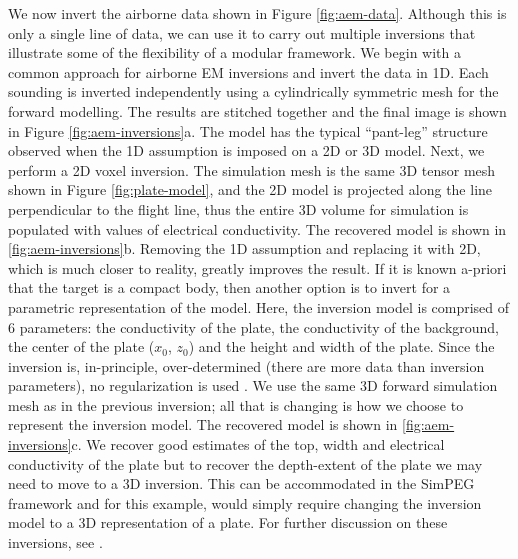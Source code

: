 \documentclass[paper]{geophysics}
\begin{document}
We now invert the airborne data shown in Figure \ref{fig:aem-data}. Although this is only a single line of data, we can use it to carry out multiple inversions that illustrate some of the flexibility of a modular framework. We begin with a  common approach for airborne EM inversions and invert the data in 1D. Each sounding is inverted independently using a cylindrically symmetric mesh for the forward modelling. The results are stitched together and the final image is shown in Figure \ref{fig:aem-inversions}a. The model has the typical ``pant-leg'' structure observed when the 1D assumption is imposed on a 2D or 3D model. Next, we perform a 2D voxel inversion. The simulation mesh is the same 3D tensor mesh shown in Figure \ref{fig:plate-model}, and the 2D model is projected along the line perpendicular to the flight line, thus the entire 3D volume for simulation is populated with values of electrical conductivity.  The recovered model is shown in \ref{fig:aem-inversions}b. Removing the 1D assumption and replacing it with  2D, which is much closer to reality, greatly improves the result. If it is known a-priori that the target is a compact body, then another option is to invert for a parametric representation of the model. Here, the inversion model is comprised of 6 parameters: the conductivity of the plate, the conductivity of the background, the center of the plate ($x_0$, $z_0$) and the height and width of the plate. Since the inversion is, in-principle, over-determined (there are more data than inversion parameters), no regularization is used \citep{Menke2012}. We use the same 3D forward simulation mesh as in the previous inversion; all that is changing is how we choose to represent the inversion model. The recovered model is shown in \ref{fig:aem-inversions}c. We recover good estimates of the top, width and electrical conductivity of the plate but to recover the depth-extent of the plate we may need to move to a 3D inversion. This can be accommodated in the SimPEG framework and for this example, would simply require changing the inversion model to a 3D representation of a plate. For further discussion on these inversions, see \cite{Heagy2018}.
\end{document}

